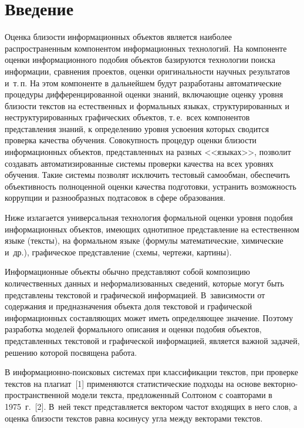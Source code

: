       \begin{multicols}{2}

            \label{st\stat}


\section{Введение}

  Оценка близости информационных объектов является наиболее
распространенным компонентом информационных технологий. На компоненте
оценки информационного подобия объектов базируются технологии поиска
информации, сравне\-ния проектов, оценки оригинальности научных результа\-тов
и~т.\,п. На этом компоненте в дальнейшем будут разработаны автоматические
про\-цедуры дифференцированной оценки знаний, вклю\-ча\-ющие оценку уровня
близости текстов на естественных и формальных языках, структури\-рованных и
неструктурированных графических объектов, т.\,е.\ всех компонентов
представления знаний, к определению уровня усвоения которых сводится
проверка качества обучения. Совокупность процедур оценки близости
информационных объектов, представленных на разных <<языках>>, позволит
создавать автоматизированные системы проверки качества на всех уровнях
обучения. Такие системы позволят исключить тестовый самообман, обеспечить
объективность полноценной оценки качества подготовки, устранить
возможность коррупции и разнообразных подтасовок в сфере образования.

  Ниже излагается универсальная технология формальной оценки уровня
подобия информационных объектов, имеющих однотипное представление на
естественном языке (тексты), на формальном языке (формулы математические,
химические и~др.), графическое представление (схемы, чертежи, картины).

  Информационные объекты обычно представляют собой композицию
количественных данных и неформализованных сведений, которые могут быть\linebreak
представлены текстовой и графической информацией. В~зависимости от
содержания и предназначения объекта доля текстовой и графической
информа\-ционных составляющих может иметь определяющее значение.
Поэтому разработка моделей формального описания и оценки подобия
объектов, представленных текстовой и графической информацией, является
важной задачей, решению которой посвящена работа.

  В информационно-поисковых системах при классификации текстов, при
проверке текстов на плагиат~[1] применяются статистические подходы на
основе век\-тор\-но-про\-стран\-ст\-вен\-ной модели текста, предложенный
Солтоном с соавторами в 1975~г.~[2]. В~ней текст представляется вектором частот
входящих в него слов, а оценка близости текстов равна косинусу угла между
векторами текстов.


\end{multicols}
